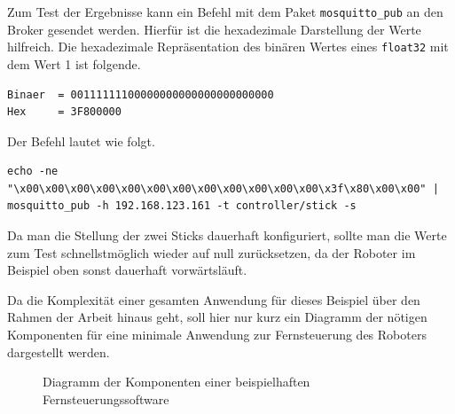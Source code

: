 Zum Test der Ergebnisse kann ein Befehl mit dem Paket \texttt{mosquitto\_pub} an den Broker gesendet werden.
Hierfür ist die hexadezimale Darstellung der Werte hilfreich.
Die hexadezimale Repräsentation des binären Wertes eines \texttt{float32} mit dem Wert \num{1} ist folgende.

\begin{lstlisting}
Binaer  = 00111111100000000000000000000000
Hex     = 3F800000
\end{lstlisting}

\noindent Der Befehl lautet wie folgt.

\begin{lstlisting}
echo -ne "\x00\x00\x00\x00\x00\x00\x00\x00\x00\x00\x00\x00\x3f\x80\x00\x00" | mosquitto_pub -h 192.168.123.161 -t controller/stick -s
\end{lstlisting}

\noindent Da man die Stellung der zwei Sticks dauerhaft konfiguriert, sollte man die Werte zum Test schnellstmöglich
wieder auf null zurücksetzen, da der Roboter im Beispiel oben sonst dauerhaft vorwärtsläuft.


Da die Komplexität einer gesamten Anwendung für dieses Beispiel über den Rahmen der Arbeit hinaus geht, soll hier nur kurz
ein Diagramm der nötigen Komponenten für eine minimale Anwendung zur Fernsteuerung des Roboters dargestellt werden.

\begin{figure}[h]
    \caption{Diagramm der Komponenten einer beispielhaften Fernsteuerungssoftware}\label{fig:remote}
\end{figure}

